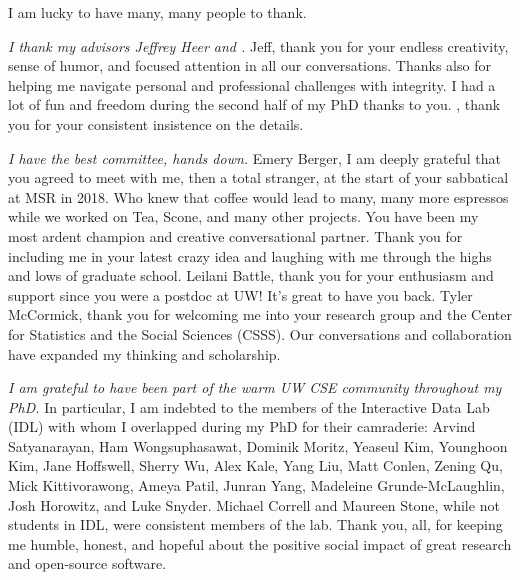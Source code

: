 I am lucky to have many, many people to thank. 

\textit{I thank my advisors Jeffrey Heer and \reneJust.} Jeff, thank you for
your endless creativity, sense of humor, and focused attention in all our
conversations. Thanks also for helping me navigate personal and professional
challenges with integrity. I had a lot of fun and freedom during the second half of my PhD
thanks to you. \rene, thank you for your consistent insistence on
the details.

\textit{I have the best committee, hands down.} Emery Berger, I am deeply grateful
that you agreed to meet with me, then a total stranger, at the start of your
sabbatical at MSR in 2018. Who knew that coffee would lead to many, many
more espressos while we worked on Tea, Scone, and many other projects. You have been my most ardent
champion and creative conversational partner. Thank you for including me in your latest crazy idea and laughing with me
through the highs and lows of graduate school. 
Leilani Battle, thank you for your enthusiasm and support since you were a
postdoc at UW! It's great to have you back.    
Tyler McCormick, thank you for welcoming me into your research group and the
Center for Statistics and the Social Sciences (CSSS). Our conversations and
collaboration have expanded my thinking and scholarship. 

\textit{I am grateful to have been part of the warm UW CSE community throughout
my PhD.} In particular, I am indebted to the members of the Interactive Data Lab
(IDL) with whom I overlapped during my PhD for their camraderie: Arvind
Satyanarayan, Ham Wongsuphasawat, Dominik Moritz, Yeaseul Kim, Younghoon Kim,
Jane Hoffswell, Sherry Wu, Alex Kale, Yang Liu, Matt Conlen, Zening Qu, Mick
Kittivorawong, Ameya Patil, Junran Yang, Madeleine Grunde-McLaughlin, Josh
Horowitz, and Luke Snyder. Michael Correll and Maureen Stone, while not students
in IDL, were consistent members of the lab. Thank you, all, for keeping me
humble, honest, and hopeful about the positive social impact of great research
and open-source software.

